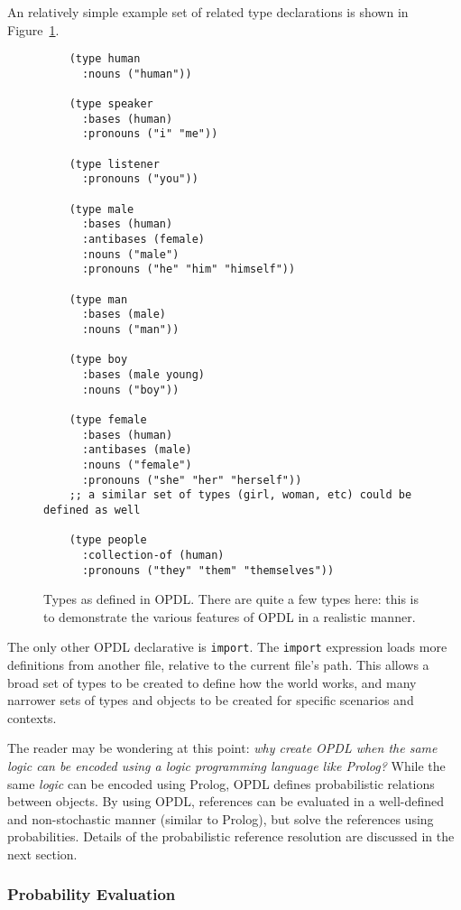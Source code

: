 \documentclass[12pt]{article}
\begin{document}
An relatively simple example set of related type declarations is shown in
Figure~\ref{opdl:types}.

\begin{figure}[htb]
    \begin{lstlisting}
    (type human
      :nouns ("human"))

    (type speaker
      :bases (human)
      :pronouns ("i" "me"))

    (type listener
      :pronouns ("you"))

    (type male
      :bases (human)
      :antibases (female)
      :nouns ("male")
      :pronouns ("he" "him" "himself"))

    (type man
      :bases (male)
      :nouns ("man"))

    (type boy
      :bases (male young)
      :nouns ("boy"))

    (type female
      :bases (human)
      :antibases (male)
      :nouns ("female")
      :pronouns ("she" "her" "herself"))
    ;; a similar set of types (girl, woman, etc) could be defined as well

    (type people
      :collection-of (human)
      :pronouns ("they" "them" "themselves"))
    \end{lstlisting}
    \caption{Types as defined in OPDL. There are quite a few types here: this
    is to demonstrate the various features of OPDL in a realistic manner.}
    \label{opdl:types}
\end{figure}

The only other OPDL declarative is \texttt{import}. The \texttt{import}
expression loads more definitions from another file, relative to the current
file's path. This allows a broad set of types to be created to define how the
world works, and many narrower sets of types and objects to be created for
specific scenarios and contexts.

The reader may be wondering at this point: \emph{why create OPDL when the same
logic can be encoded using a logic programming language like Prolog?} While the
same \emph{logic} can be encoded using Prolog, OPDL defines probabilistic
relations between objects. By using OPDL, references can be evaluated in a
well-defined and non-stochastic manner (similar to Prolog), but solve the
references using probabilities. Details of the probabilistic reference
resolution are discussed in the next section.

\subsubsection{Probability Evaluation}
\end{document}
